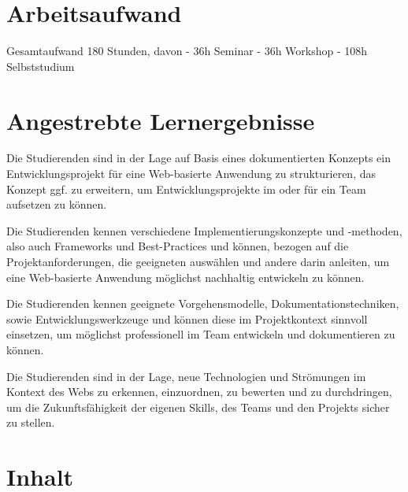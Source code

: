 \section*{Arbeitsaufwand
\label{/mi-2017/modulbeschreibungen-master/MA_WTW_Modul_Web-Technologien}}\label{arbeitsaufwand-pathlabelmi-2017modulbeschreibungen-mastermaux5fwtwux5fmodulux5fweb-technologien}

Gesamtaufwand 180 Stunden, davon - 36h Seminar - 36h Workshop - 108h
Selbststudium

\section*{Angestrebte
Lernergebnisse\label{/mi-2017/modulbeschreibungen-master/MA_WTW_Modul_Web-Technologien}}\label{angestrebte-lernergebnissepathlabelmi-2017modulbeschreibungen-mastermaux5fwtwux5fmodulux5fweb-technologien}

Die Studierenden sind in der Lage auf Basis eines dokumentierten
Konzepts ein Entwicklungsprojekt für eine Web-basierte Anwendung zu
strukturieren, das Konzept ggf. zu erweitern, um Entwicklungsprojekte im
oder für ein Team aufsetzen zu können.

Die Studierenden kennen verschiedene Implementierungskonzepte und
-methoden, also auch Frameworks und Best-Practices und können, bezogen
auf die Projektanforderungen, die geeigneten auswählen und andere darin
anleiten, um eine Web-basierte Anwendung möglichst nachhaltig entwickeln
zu können.

Die Studierenden kennen geeignete Vorgehensmodelle,
Dokumentationstechniken, sowie Entwicklungswerkzeuge und können diese im
Projektkontext sinnvoll einsetzen, um möglichst professionell im Team
entwickeln und dokumentieren zu können.

Die Studierenden sind in der Lage, neue Technologien und Strömungen im
Kontext des Webs zu erkennen, einzuordnen, zu bewerten und zu
durchdringen, um die Zukunftsfähigkeit der eigenen Skills, des Teams und
den Projekts sicher zu stellen.

\section*{Inhalt\label{/mi-2017/modulbeschreibungen-master/MA_WTW_Modul_Web-Technologien}}\label{inhaltpathlabelmi-2017modulbeschreibungen-mastermaux5fwtwux5fmodulux5fweb-technologien}

